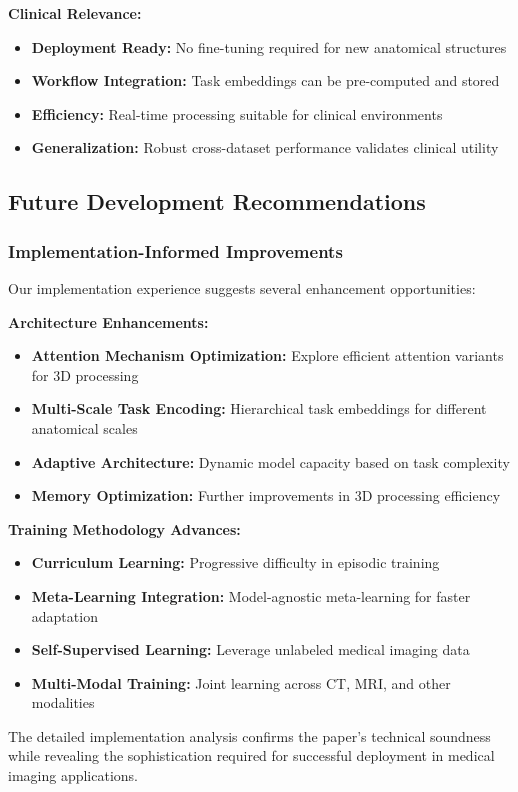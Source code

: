 \textbf{Clinical Relevance:}
\begin{itemize}
    \item \textbf{Deployment Ready:} No fine-tuning required for new anatomical structures
    \item \textbf{Workflow Integration:} Task embeddings can be pre-computed and stored
    \item \textbf{Efficiency:} Real-time processing suitable for clinical environments
    \item \textbf{Generalization:} Robust cross-dataset performance validates clinical utility
\end{itemize}

\subsection{Future Development Recommendations}

\subsubsection*{Implementation-Informed Improvements}
Our implementation experience suggests several enhancement opportunities:

\textbf{Architecture Enhancements:}
\begin{itemize}
    \item \textbf{Attention Mechanism Optimization:} Explore efficient attention variants for 3D processing
    \item \textbf{Multi-Scale Task Encoding:} Hierarchical task embeddings for different anatomical scales
    \item \textbf{Adaptive Architecture:} Dynamic model capacity based on task complexity
    \item \textbf{Memory Optimization:} Further improvements in 3D processing efficiency
\end{itemize}

\textbf{Training Methodology Advances:}
\begin{itemize}
    \item \textbf{Curriculum Learning:} Progressive difficulty in episodic training
    \item \textbf{Meta-Learning Integration:} Model-agnostic meta-learning for faster adaptation
    \item \textbf{Self-Supervised Learning:} Leverage unlabeled medical imaging data
    \item \textbf{Multi-Modal Training:} Joint learning across CT, MRI, and other modalities
\end{itemize}

The detailed implementation analysis confirms the paper's technical soundness while revealing the sophistication required for successful deployment in medical imaging applications.
